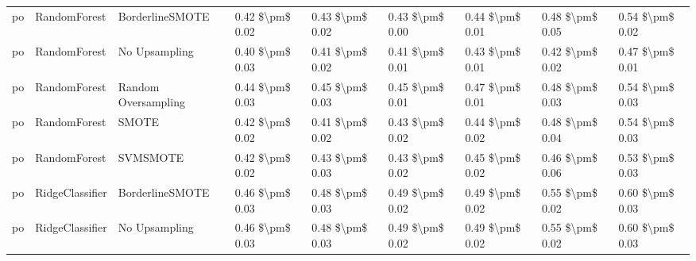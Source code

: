 \begin{tabular}{lllllllll}
      po &                    RandomForest &               BorderlineSMOTE & 0.42 \$\textbackslash pm\$ 0.02 &           0.43 \$\textbackslash pm\$ 0.02 &       0.43 \$\textbackslash pm\$ 0.00 &        0.44 \$\textbackslash pm\$ 0.01 &                         0.48 \$\textbackslash pm\$ 0.05 &     0.54 \$\textbackslash pm\$ 0.02 \\
      po &                    RandomForest &                 No Upsampling & 0.40 \$\textbackslash pm\$ 0.03 &           0.41 \$\textbackslash pm\$ 0.02 &       0.41 \$\textbackslash pm\$ 0.01 &        0.43 \$\textbackslash pm\$ 0.01 &                         0.42 \$\textbackslash pm\$ 0.02 &     0.47 \$\textbackslash pm\$ 0.01 \\
      po &                    RandomForest &           Random Oversampling & 0.44 \$\textbackslash pm\$ 0.03 &           0.45 \$\textbackslash pm\$ 0.03 &       0.45 \$\textbackslash pm\$ 0.01 &        0.47 \$\textbackslash pm\$ 0.01 &                         0.48 \$\textbackslash pm\$ 0.03 &     0.54 \$\textbackslash pm\$ 0.03 \\
      po &                    RandomForest &                         SMOTE & 0.42 \$\textbackslash pm\$ 0.02 &           0.41 \$\textbackslash pm\$ 0.02 &       0.43 \$\textbackslash pm\$ 0.02 &        0.44 \$\textbackslash pm\$ 0.02 &                         0.48 \$\textbackslash pm\$ 0.04 &     0.54 \$\textbackslash pm\$ 0.03 \\
      po &                    RandomForest &                      SVMSMOTE & 0.42 \$\textbackslash pm\$ 0.02 &           0.43 \$\textbackslash pm\$ 0.03 &       0.43 \$\textbackslash pm\$ 0.02 &        0.45 \$\textbackslash pm\$ 0.02 &                         0.46 \$\textbackslash pm\$ 0.06 &     0.53 \$\textbackslash pm\$ 0.03 \\
      po &                 RidgeClassifier &               BorderlineSMOTE & 0.46 \$\textbackslash pm\$ 0.03 &           0.48 \$\textbackslash pm\$ 0.03 &       0.49 \$\textbackslash pm\$ 0.02 &        0.49 \$\textbackslash pm\$ 0.02 &                         0.55 \$\textbackslash pm\$ 0.02 &     0.60 \$\textbackslash pm\$ 0.03 \\
      po &                 RidgeClassifier &                 No Upsampling & 0.46 \$\textbackslash pm\$ 0.03 &           0.48 \$\textbackslash pm\$ 0.03 &       0.49 \$\textbackslash pm\$ 0.02 &        0.49 \$\textbackslash pm\$ 0.02 &                         0.55 \$\textbackslash pm\$ 0.02 &     0.60 \$\textbackslash pm\$ 0.03 \\

\end{tabular}
